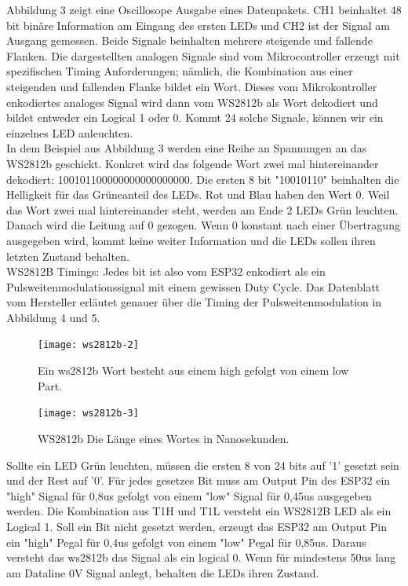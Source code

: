 \documentclass[12pt,a4paper]{article}
\begin{document}
Abbildung 3 zeigt eine Oscillosope Ausgabe eines Datenpakets. CH1 beinhaltet 48 bit binäre Information am Eingang des ersten LEDs und CH2 ist der Signal am Ausgang gemessen. Beide Signale beinhalten mehrere steigende und fallende Flanken. Die dargestellten analogen Signale sind vom Mikrocontroller erzeugt mit spezifischen Timing Anforderungen; nämlich, die Kombination aus einer steigenden und fallenden Flanke bildet ein Wort. Dieses vom Mikrokontroller enkodiertes analoges Signal wird dann vom WS2812b als Wort dekodiert und bildet entweder ein Logical 1 oder 0. Kommt 24 solche Signale, können wir ein einzelnes LED anleuchten.
\vspace{1ex}\\
In dem Beispiel aus Abbildung 3 werden eine Reihe an Spannungen an das WS2812b geschickt. Konkret wird das folgende Wort zwei mal hintereinander dekodiert: 100101100000000000000000. Die ersten 8 bit "10010110" beinhalten die Helligkeit für das Grüneanteil des LEDs. Rot und Blau haben den Wert 0. Weil das Wort zwei mal hintereinander steht, werden am Ende 2 LEDs Grün leuchten. Danach wird die Leitung auf 0 gezogen. Wenn 0 konstant nach einer Übertragung ausgegeben wird, kommt keine weiter Information und die LEDs sollen ihren letzten Zustand behalten. \cite{esptiming:Doku}
\vspace{1ex}\\
WS2812B Timings: Jedes bit ist also vom ESP32 enkodiert als ein Pulsweitenmodulationssignal mit einem gewissen Duty Cycle. Das Datenblatt vom Hersteller erläutet genauer über die Timing der Pulsweitenmodulation in Abbildung 4 und 5. \cite{esptime32:Dok}

	\begin{figure}[h]
	\centering
	\texttt{[image: ws2812b-2]}
	\caption{\label{fig:logic}Ein ws2812b Wort besteht aus einem high gefolgt von 		einem low Part.}
	\end{figure}
	\begin{figure}[h]
	\centering
	\texttt{[image: ws2812b-3]}
	\caption{\label{fig:timing}WS2812b Die Länge eines Wortes in Nanosekunden.}
	\end{figure}
	
Sollte ein LED Grün leuchten, müssen die ersten 8 von 24 bits auf '1' gesetzt sein und der Rest auf '0'. Für jedes gesetzes Bit muss am Output Pin des ESP32 ein "high" Signal für 0,8us gefolgt von einem "low" Signal für 0,45us ausgegeben werden. Die Kombination aus T1H und T1L versteht ein WS2812B LED als ein Logical 1. Soll ein Bit nicht gesetzt werden, erzeugt das ESP32 am Output Pin ein "high" Pegal für 0,4us gefolgt von einem "low" Pegal für 0,85us. Daraus versteht das ws2812b das Signal als ein logical 0. Wenn für mindestens 50us lang am Dataline 0V Signal anlegt, behalten die LEDs ihren Zustand. \cite{esptime32:Dok}
\vspace{1ex}\\
\end{document}
